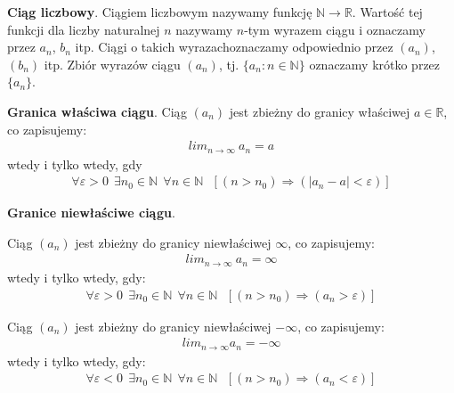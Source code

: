 \documentclass[12pt]{article}
\begin{document}
    \begin{definition}
        \textbf{Ciąg liczbowy}. Ciągiem liczbowym nazywamy funkcję $\mathbb{N} \rightarrow \mathbb{R}$. Wartość tej
        funkcji dla liczby naturalnej $n$ nazywamy $n$-tym wyrazem ciągu i oznaczamy przez $a_n$, $b_n$ itp. Ciągi o
        takich wyrazachoznaczamy odpowiednio przez $(a_n)$, $(b_n)$  itp. Zbiór wyrazów ciągu $(a_n)$, tj.
        $\{a_n : n  \in \mathbb{N}\}$ oznaczamy krótko przez  $\{a_n\}$.
    \end{definition}

    \begin{definition}
        \textbf{Granica właściwa ciągu}. Ciąg $(a_n)$ jest zbieżny do granicy właściwej $a \in \mathbb{R}$, co zapisujemy:
        \begin{align*}
            lim_{n  \rightarrow \infty} ~ a_n = a
        \end{align*}
        wtedy i tylko wtedy, gdy
        \begin{align*}
            \forall \varepsilon > 0 ~~ \exists  n_0 \in \mathbb{N} ~~ \forall n \in \mathbb{N} ~~~ [(n > n_0) \Rightarrow (|a_n - a| < \varepsilon)]
        \end{align*}
    \end{definition}

    \begin{definition}
        \textbf{Granice niewłaściwe ciągu}.

        Ciąg $(a_n)$ jest zbieżny do granicy niewłaściwej $\infty$, co zapisujemy:
        \begin{align*}
            lim_{n \rightarrow \infty} ~ a_n = \infty
        \end{align*}
        wtedy i tylko wtedy, gdy:
        \begin{align*}
            \forall \varepsilon > 0 ~~ \exists  n_0 \in \mathbb{N} ~~ \forall n \in \mathbb{N} ~~~ [(n > n_0) \Rightarrow (a_n > \varepsilon)]
        \end{align*}

        Ciąg $(a_n)$ jest zbieżny do granicy niewłaściwej $-\infty$, co zapisujemy:
        \begin{align*}
            lim_{n \rightarrow \infty} a_n = -\infty
        \end{align*}
        wtedy i tylko wtedy, gdy:
        \begin{align*}
            \forall \varepsilon < 0 ~~ \exists  n_0 \in \mathbb{N} ~~ \forall n \in \mathbb{N} ~~~ [(n > n_0) \Rightarrow (a_n < \varepsilon)]
        \end{align*}
    \end{definition}
\end{document}
